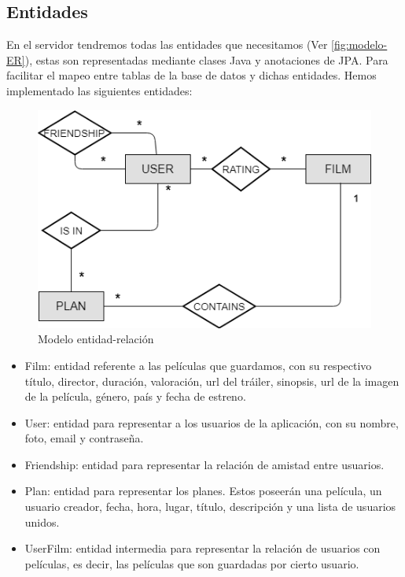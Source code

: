 \subsection{Entidades}
\label{makereference4.3.1}
En el servidor tendremos todas las entidades que necesitamos
 (Ver \autoref{fig:modelo-ER}), estas son representadas
 mediante clases Java y anotaciones de JPA. Para facilitar el mapeo entre
 tablas de la base de datos y dichas entidades.
Hemos implementado las siguientes entidades:
\begin{figure}[H]
    \centering
    \includegraphics[width=6in]{figures/chapter-4/Entidades-ER.png}
    \caption{Modelo entidad-relación}
    \label{fig:modelo-ER}
\end{figure}
\begin{itemize}
    \item Film: entidad referente a las películas que guardamos, con su respectivo título, director, duración, valoración, url del tráiler, sinopsis, url de la imagen de la película, género, país y fecha de estreno.
    \item User: entidad para representar a los usuarios de la aplicación, con su nombre, foto, email y contraseña.
    \item Friendship: entidad para representar la relación de amistad entre usuarios.
    \item Plan: entidad para representar los planes. Estos poseerán una película, un usuario creador, fecha, hora, lugar, título, descripción y una lista de usuarios unidos.
    \item UserFilm: entidad intermedia para representar la relación de usuarios con películas, es decir, las películas que son guardadas por cierto usuario.
\end{itemize}
